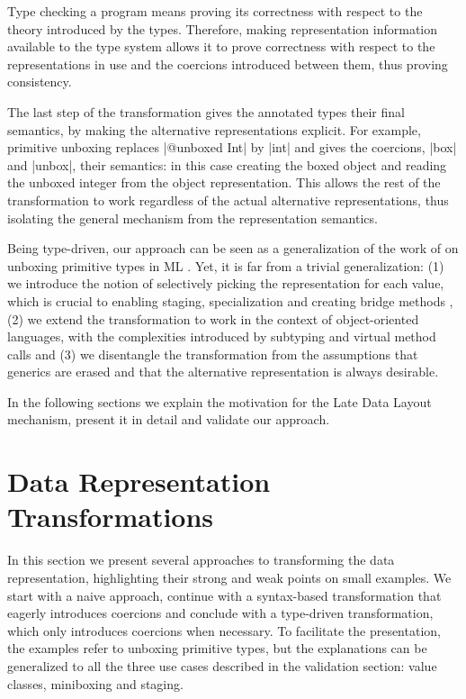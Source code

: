  Type checking a program means proving its correctness with respect to the theory introduced by the types. Therefore, making representation information available to the type system allows it to prove correctness with respect to the representations in use and the coercions introduced between them, thus proving consistency.

 The last step of the transformation gives the annotated types their final semantics, by making the alternative representations explicit. For example, primitive unboxing replaces |@unboxed Int| by |int| and gives the coercions, |box| and |unbox|, their semantics: in this case creating the boxed object and reading the unboxed integer from the object representation. This allows the rest of the transformation to work regardless of the actual alternative representations, thus isolating the general mechanism from the representation semantics.

Being type-driven, our approach can be seen as a generalization of the work of  on unboxing primitive types in ML \cite{leroy-unboxed-objects}. Yet, it is far from a trivial generalization: (1) we introduce the notion of selectively picking the representation for each value, which is crucial to enabling staging, specialization and creating bridge methods \cite{cartwright-nextgen}, (2) we extend the transformation to work in the context of object-oriented languages, with the complexities introduced by subtyping and virtual method calls and (3) we disentangle the transformation from the assumptions that generics are erased and that the alternative representation is always desirable.

In the following sections we explain the motivation for the Late Data Layout mechanism, present it in detail and validate our approach.

\section{Data Representation Transformations}
\label{ldl:sec:problem}

In this section we present several approaches to transforming the data representation, highlighting their strong and weak points on small examples. We start with a naive approach, continue with a syntax-based transformation that eagerly introduces coercions and conclude with a type-driven transformation, which only introduces coercions when necessary. To facilitate the presentation, the examples refer to unboxing primitive types, but the explanations can be generalized to all the three use cases described in the validation section: value classes, miniboxing and staging.

